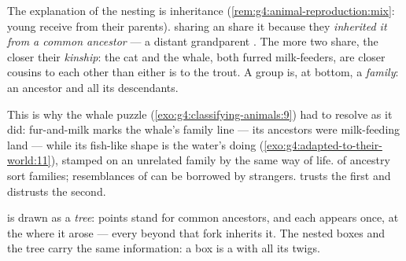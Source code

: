 \begin{proposition}\label{prop:g6:classification-kinship:kinship}
The explanation of the nesting is inheritance
(\cref{rem:g4:animal-reproduction:mix}: young receive from
their parents).  sharing an  share it
because they \emph{inherited it from a common ancestor} ---
a distant grandparent . The more  two
 share, the closer their
\emph{kinship}: the cat and the whale, both
furred milk-feeders, are closer cousins to each other than
either is to the trout. A  group is, at
bottom, a \emph{family}: an ancestor and all its
descendants.
\end{proposition}
\admitted

\begin{example}\label{ex:g6:classification-kinship:whale}
This is why the whale puzzle
(\cref{exo:g4:classifying-animals:9}) had to resolve as it
did: fur-and-milk marks the whale's family line --- its
ancestors were milk-feeding land  --- while its
fish-like shape is the water's doing
(\cref{exo:g4:adapted-to-their-world:11}), stamped on an
unrelated family by the same way of life.  of
ancestry sort families; resemblances of  can be
borrowed by strangers.  trusts the first and
distrusts the second.
\end{example}

\begin{definition}\label{def:g6:classification-kinship:tree}
 is drawn as a \emph{tree}:
 points stand for common ancestors, and each
 appears once, at the  where it arose ---
every  beyond that fork inherits it. The nested
boxes and the tree carry the same information: a box is a
 with all its twigs.
\end{definition}


